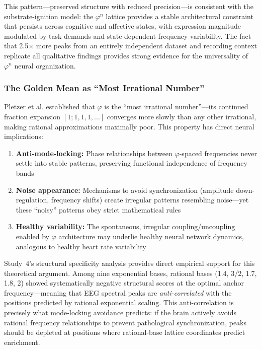 \documentclass[11pt,a4paper]{article}
\newcommand{\phisym}{\varphi}
\begin{document}
This pattern---preserved structure with reduced precision---is consistent with the substrate-ignition model: the $\phisym^n$ lattice provides a stable architectural constraint that persists across cognitive and affective states, with expression magnitude modulated by task demands and state-dependent frequency variability. The fact that 2.5$\times$ more peaks from an entirely independent dataset and recording context replicate all qualitative findings provides strong evidence for the universality of $\phisym^n$ neural organization.

\subsubsection{The Golden Mean as ``Most Irrational Number''}

Pletzer et al. \parencite{pletzer2010golden} established that $\phisym$ is the ``most irrational number''---its continued fraction expansion $[1; 1, 1, 1, ...]$ converges more slowly than any other irrational, making rational approximations maximally poor. This property has direct neural implications:

\begin{enumerate}
    \item \textbf{Anti-mode-locking:} Phase relationships between $\phisym$-spaced frequencies never settle into stable patterns, preserving functional independence of frequency bands
    \item \textbf{Noise appearance:} Mechanisms to avoid synchronization (amplitude down-regulation, frequency shifts) create irregular patterns resembling noise---yet these ``noisy'' patterns obey strict mathematical rules
    \item \textbf{Healthy variability:} The spontaneous, irregular coupling/uncoupling enabled by $\phisym$ architecture may underlie healthy neural network dynamics, analogous to healthy heart rate variability
\end{enumerate}

Study~4's structural specificity analysis provides direct empirical support for this theoretical argument. Among nine exponential bases, rational bases (1.4, 3/2, 1.7, 1.8, 2) showed systematically negative structural scores at the optimal anchor frequency---meaning that EEG spectral peaks are \textit{anti-correlated} with the positions predicted by rational exponential scaling. This anti-correlation is precisely what mode-locking avoidance predicts: if the brain actively avoids rational frequency relationships to prevent pathological synchronization, peaks should be depleted at positions where rational-base lattice coordinates predict enrichment.
\end{document}
